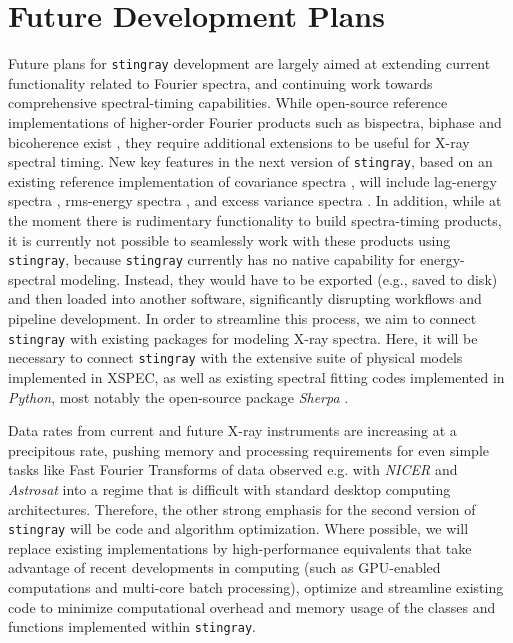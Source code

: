 \documentclass[twocolumn]{aastex62}
\newcommand{\stingray}{\texttt{stingray}\xspace}
\begin{document}

\section{Future Development Plans}
\label{sec:future}

Future plans for \stingray development are largely aimed at extending current functionality related to Fourier spectra, and continuing work towards comprehensive spectral-timing capabilities. 
While open-source reference implementations of higher-order Fourier products such as bispectra, biphase and bicoherence exist \citep{maccarone2002,maccarone2005,maccarone2013}, they require additional extensions to be useful for X-ray spectral timing. 
New key features in the next version of \stingray, based on an existing reference implementation of covariance spectra \citep{WilkinsonUttley09}, will include lag-energy spectra \citep{Vaughanetal94}, rms-energy spectra \citep{Revnivtsevetal99}, and excess variance spectra \citep{Vaughanetal03}. 
In addition, while at the moment there is rudimentary functionality to build spectra-timing products, it is currently not possible to seamlessly work with these products using \stingray, because \stingray currently has no native capability for energy-spectral modeling. 
Instead, they would have to be exported (e.g., saved to disk) and then loaded into another software, significantly disrupting workflows and pipeline development. 
In order to streamline this process, we aim to connect \stingray with existing packages for modeling X-ray spectra. 
Here, it will be necessary to connect \stingray with the extensive suite of physical models implemented in XSPEC, as well as existing spectral fitting codes implemented in \textit{Python}, most notably the open-source package \textit{Sherpa} \citep{sherpa}.

Data rates from current and future X-ray instruments are increasing at a precipitous rate, pushing memory and processing requirements for even simple tasks like Fast Fourier Transforms of data observed e.g. with \textit{NICER} and \textit{Astrosat} into a regime that is difficult with standard desktop computing architectures. 
Therefore, the other strong emphasis for the second version of \stingray will be code and algorithm optimization. 
Where possible, we will replace existing implementations by high-performance equivalents that take advantage of recent developments in computing (such as GPU-enabled computations and multi-core batch processing), optimize and streamline existing code to minimize computational overhead and memory usage of the classes and functions implemented within \stingray. 
\end{document}
